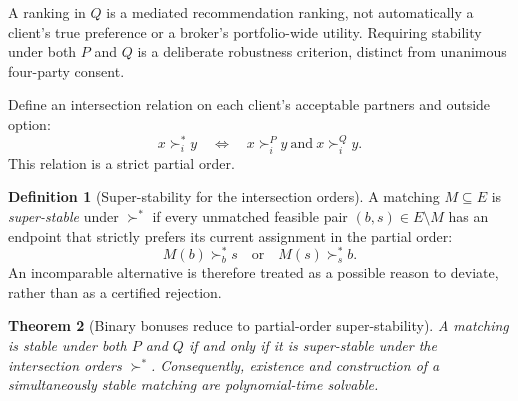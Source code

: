 \documentclass[11pt,letterpaper]{article}
\newtheorem{theorem}{Theorem}[section]
\theoremstyle{definition}
\newtheorem{definition}[theorem]{Definition}
\theoremstyle{remark}
\begin{document}
A ranking in \(Q\) is a mediated recommendation ranking, not automatically a
client's true preference or a broker's portfolio-wide utility.
Requiring stability under both \(P\) and \(Q\) is a deliberate robustness
criterion, distinct from unanimous four-party consent.

Define an intersection relation on each client's acceptable partners and
outside option:
\begin{equation}
x\succ_i^* y
\quad\Longleftrightarrow\quad
x\succ_i^P y\ \text{and}\ x\succ_i^Q y.
\label{eq:intersection}
\end{equation}
This relation is a strict partial order.

\begin{definition}[Super-stability for the intersection orders]
A matching \(M\subseteq E\) is \emph{super-stable} under \(\succ^*\) if every
unmatched feasible pair \((b,s)\in E\setminus M\) has an endpoint that strictly
prefers its current assignment in the partial order:
\begin{equation}
M(b)\succ_b^* s
\quad\text{or}\quad
M(s)\succ_s^* b.
\label{eq:superstable}
\end{equation}
An incomparable alternative is therefore treated as a possible reason to
deviate, rather than as a certified rejection.
\end{definition}

\begin{theorem}[Binary bonuses reduce to partial-order super-stability]
\label{thm:binary}
A matching is stable under both \(P\) and \(Q\) if and only if it is
super-stable under the intersection orders \(\succ^*\).
Consequently, existence and construction of a simultaneously stable matching
are polynomial-time solvable.
\end{theorem}
\end{document}
